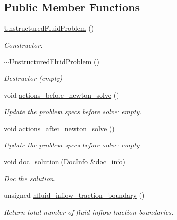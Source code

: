 \subsection*{Public Member Functions}
\begin{DoxyCompactItemize}
\item 
\hyperlink{classUnstructuredFluidProblem_a9751f4afac540e148b3d90ae43dd5187}{Unstructured\+Fluid\+Problem} ()
\begin{DoxyCompactList}\small\item\em Constructor\+: \end{DoxyCompactList}\item 
\hyperlink{classUnstructuredFluidProblem_a4d660faa6bae35197a4ea73139ac9963}{$\sim$\+Unstructured\+Fluid\+Problem} ()
\begin{DoxyCompactList}\small\item\em Destructor (empty) \end{DoxyCompactList}\item 
void \hyperlink{classUnstructuredFluidProblem_a3d93e13193cd466fa0901a470e281765}{actions\+\_\+before\+\_\+newton\+\_\+solve} ()
\begin{DoxyCompactList}\small\item\em Update the problem specs before solve\+: empty. \end{DoxyCompactList}\item 
void \hyperlink{classUnstructuredFluidProblem_af6811af7c3d4241254278ec246733d93}{actions\+\_\+after\+\_\+newton\+\_\+solve} ()
\begin{DoxyCompactList}\small\item\em Update the problem specs before solve\+: empty. \end{DoxyCompactList}\item 
void \hyperlink{classUnstructuredFluidProblem_abcc9f0065665ae5239988b1a812e3f78}{doc\+\_\+solution} (Doc\+Info \&doc\+\_\+info)
\begin{DoxyCompactList}\small\item\em Doc the solution. \end{DoxyCompactList}\item 
unsigned \hyperlink{classUnstructuredFluidProblem_a8afc18327561107094fa94f2918a385f}{nfluid\+\_\+inflow\+\_\+traction\+\_\+boundary} ()
\begin{DoxyCompactList}\small\item\em Return total number of fluid inflow traction boundaries. \end{DoxyCompactList}\item 

\end{DoxyCompactItemize}
